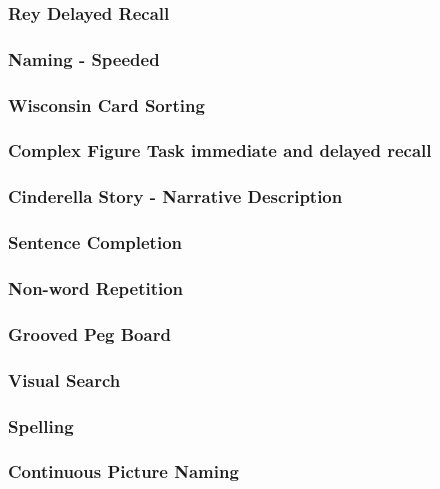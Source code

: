 \documentclass{article}
\begin{document}
\subsubsection{Rey Delayed Recall}
\subsubsection{Naming - Speeded}


\subsubsection{Wisconsin Card Sorting}
\subsubsection{Complex Figure Task immediate and delayed recall}
\subsubsection{Cinderella Story - Narrative Description}
\subsubsection{Sentence Completion}
\subsubsection{Non-word Repetition}
\subsubsection{Grooved Peg Board}
\subsubsection{Visual Search}
\subsubsection{Spelling}
\subsubsection{Continuous Picture Naming}
\end{document}
